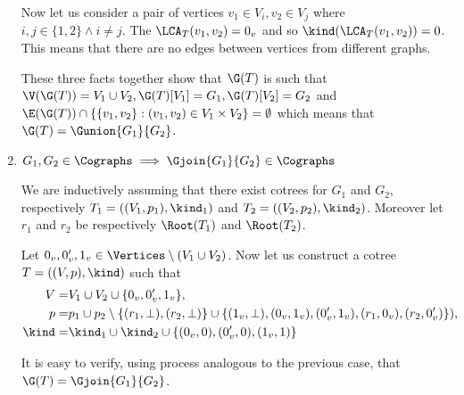 \begin{enumerate}
          Now let us consider a pair of vertices $v_1 \in V_i, v_2 \in V_j$ where $i,j \in \{1,2\} \land i \neq j$. The $\LCA_T(v_1, v_2) = 0_v$ and so $\kind(\LCA_T(v_1, v_2)) = 0$. This means that there are no edges between vertices from different graphs.

          These three facts together show that $\G(T)$ is such that $\V(\G(T)) = V_1 \cup V_2, \G(T)[V_1] = G_1, \G(T)[V_2] = G_2$ and $\E(\G(T)) \cap \{\{v_1, v_2\} : (v_1, v_2) \in V_1 \times V_2\} = \emptyset$ which means that $\G(T) = \Gunion{G_1}{G_2}$.

    \item $G_1,G_2 \in \Cographs \implies \Gjoin{G_1}{G_2} \in \Cographs$

          We are inductively assuming that there exist cotrees for $G_1$ and $G_2$, respectively $T_1 = ((V_1, p_1), \kind_1)$ and $T_2 = ((V_2, p_2), \kind_2)$. Moreover let $r_1$ and $r_2$ be respectively $\Root(T_1)$ and $\Root(T_2)$.

          Let $0_v, 0_v', 1_v \in \Vertices \setminus (V_1 \cup V_2)$. Now let us construct a cotree $T = ((V, p), \kind)$ such that
          \[
              \begin{split}
                  V = & V_1\cup V_2 \cup \{0_v,0_v',1_v\}, \\
                  p = & p_1 \cup p_2 \setminus \{(r_1,\bot), (r_2, \bot)\} \cup \{(1_v, \bot), (0_v, 1_v), (0_v', 1_v), (r_1, 0_v), (r_2, 0_v')\}
                  ), \\
                  \kind = & \kind_1 \cup \kind_2 \cup \{(0_v,0), (0_v',0), (1_v,1)\} \\
              \end{split}
          \]

          It is easy to verify, using process analogous to the previous case, that $\G(T) = \Gjoin{G_1}{G_2}$.





\end{enumerate}

